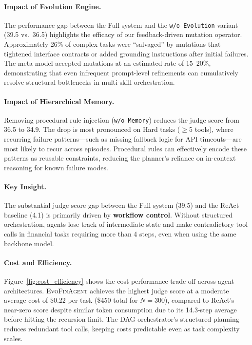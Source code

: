 \documentclass{article}
\begin{document}
\paragraph{Impact of Evolution Engine.}
The performance gap between the Full system and the \texttt{w/o Evolution} variant (39.5 vs.\ 36.5) highlights the efficacy of our feedback-driven mutation operator. Approximately 26\% of complex tasks were ``salvaged'' by mutations that tightened interface contracts or added grounding instructions after initial failures. The meta-model accepted mutations at an estimated rate of 15--20\%, demonstrating that even infrequent prompt-level refinements can cumulatively resolve structural bottlenecks in multi-skill orchestration.

\paragraph{Impact of Hierarchical Memory.}
Removing procedural rule injection (\texttt{w/o Memory}) reduces the judge score from 36.5 to 34.9. 
The drop is most pronounced on Hard tasks ($\ge$5 tools), where recurring failure patterns—such as missing fallback logic for API timeouts—are most likely to recur across episodes. 
Procedural rules can effectively encode these patterns as reusable constraints, reducing the planner's reliance on in-context reasoning for known failure modes.

\paragraph{Key Insight.}
The substantial judge score gap between the Full system (39.5) and the ReAct baseline (4.1) is primarily driven by \textbf{workflow control}. Without structured orchestration, agents lose track of intermediate state and make contradictory tool calls in financial tasks requiring more than 4 steps, even when using the same backbone model. 

\paragraph{Cost and Efficiency.}
Figure~\ref{fig:cost_efficiency} shows the cost-performance trade-off across agent architectures. \textsc{EvoFinAgent} achieves the highest judge score at a moderate average cost of \$0.22 per task (\$450 total for $N=300$), compared to ReAct's near-zero score despite similar token consumption due to its 14.3-step average before hitting the recursion limit. The DAG orchestrator's structured planning reduces redundant tool calls, keeping costs predictable even as task complexity scales.
\end{document}
